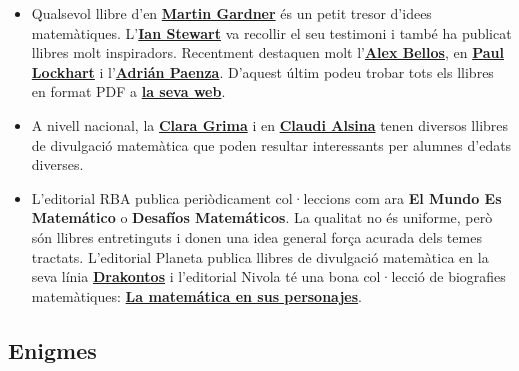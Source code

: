 \documentclass[a4paper, 12pt]{article}
\begin{document}
            \begin{itemize}
                \item Qualsevol llibre d'en \href{https://ca.wikipedia.org/wiki/Martin_Gardner}{\textbf{Martin Gardner}} és un petit tresor d'idees matemàtiques. L'\href{https://ca.wikipedia.org/wiki/Ian_Stewart_(matem\%C3\%A0tic)}{\textbf{Ian Stewart}} va recollir el seu testimoni i també ha publicat llibres molt inspiradors. Recentment destaquen molt l'\href{https://en.wikipedia.org/wiki/Alex_Bellos}{\textbf{Alex Bellos}}, en \href{https://www.hup.harvard.edu/catalog.php?isbn=9780674284388}{\textbf{Paul Lockhart}} i l'\href{https://es.wikipedia.org/wiki/Adri\%C3\%A1n_Paenza}{\textbf{Adrián Paenza}}. D'aquest últim podeu trobar tots els llibres en format PDF a \href{http://cms.dm.uba.ar/material/paenza}{\textbf{la seva web}}.
                \item A nivell nacional, la \href{https://ca.wikipedia.org/wiki/Clara_Grima_Ruiz}{\textbf{Clara Grima}} i en \href{http://claudialsina.com/ca/publicacions}{\textbf{Claudi Alsina}} tenen diversos llibres de divulgació matemàtica que poden resultar interessants per alumnes d'edats diverses.
                \item L'editorial RBA publica periòdicament col·leccions com ara \textbf{El Mundo Es Matemático} o \textbf{Desafíos Matemáticos}. La qualitat no és uniforme, però són llibres entretinguts i donen una idea general força acurada dels temes tractats. L'editorial Planeta publica llibres de divulgació matemàtica en la seva línia \href{https://www.planetadelibros.com/coleccion-drakontos/0000965600}{\textbf{Drakontos}} i l'editorial Nivola té una bona col·lecció de biografies matemàtiques: \href{https://www.nivola.com/listado_libros.php?idcol=2&nombre=4\%20-\%20La\%20matem\%E1tica\%20en\%20sus\%20personajes\%20-\%20Biograf\%EDas\%20de\%20los\%20grandes\%20matem\%E1ticos}{\textbf{La matemática en sus personajes}}.
            \end{itemize}

        \subsection*{Enigmes}
\end{document}
